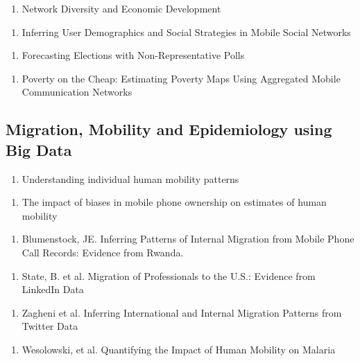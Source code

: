 \begin{enumerate}
\item Network Diversity and Economic Development
\end{enumerate}
\begin{enumerate}
\item Inferring User Demographics and Social Strategies in Mobile Social Networks \cite{Dong:2014:IUD:2623330.2623703}
\end{enumerate}
\begin{enumerate}
\item Forecasting Elections with Non-Representative Polls\cite{Wang2015980}
\end{enumerate}
\begin{enumerate}
\item Poverty on the Cheap: Estimating Poverty Maps Using Aggregated Mobile Communication Networks\cite{Smith-Clarke:2014:PCE:2556288.2557358}
\end{enumerate}

\subsection{Migration, Mobility and Epidemiology using Big Data}
\begin{enumerate}
\item Understanding individual human mobility patterns\cite{Gonz_lez_2008}
\end{enumerate}

\begin{enumerate}
\item The impact of biases in mobile phone ownership on estimates of human mobility
\end{enumerate}
\begin{enumerate}
\item Blumenstock, JE. Inferring Patterns of Internal Migration from Mobile Phone Call Records: Evidence from Rwanda. 
\end{enumerate}
\begin{enumerate}
\item State, B. et al. Migration of Professionals to the U.S.: Evidence from LinkedIn Data
\end{enumerate}
\begin{enumerate}
\item Zagheni et al. Inferring International and Internal Migration Patterns from Twitter Data
\end{enumerate}

\begin{enumerate}
\item Wesolowski, et al. Quantifying the Impact of Human Mobility on Malaria \cite{Wesolowski_2012}
\end{enumerate}


